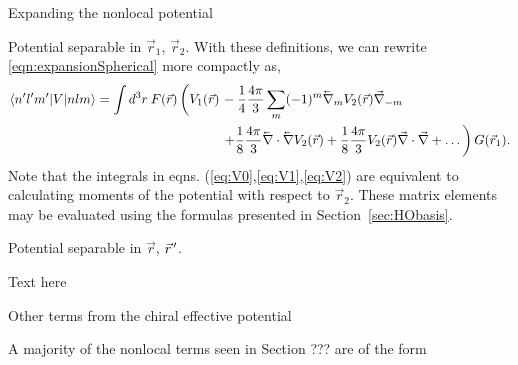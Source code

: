 \begin{section}{Expanding the nonlocal potential}
\begin{subsection}{Potential separable in $\vec{r}_1$, $\vec{r}_2$.\label{subsec:form1}}
With these definitions, we can rewrite \eqref{eqn:expansionSpherical} more compactly as,
\begin{equation}\label{eqn:expansion2}
\begin{split}
\braket{n' l' m'| V | n l m} =  \int d^3r\: F(\vec{r})\left( \vphantom{\frac{1}{2}}V_1(\vec{r})\right.&-\frac{1}{4}\frac{4\pi}{3}\sum_m(-1)^m \lvec{\nabla}_{m}  V_2(\vec{r}) \vec{\nabla}_{-m} \\
&\left.+\frac{1}{8}\frac{4\pi}{3}\lvec{\nabla}\cdot\lvec{\nabla} V_2(\vec{r})+\frac{1}{8}\frac{4\pi}{3}V_2(\vec{r})\vec{\nabla}\cdot\vec{\nabla}+\dots\right) G(\vec{r}_1).
\end{split}
\end{equation}
Note that the integrals in eqns. (\ref{eq:V0},\ref{eq:V1},\ref{eq:V2})  are equivalent to calculating moments of the potential with respect to $\vec{r}_2$. These matrix elements may be evaluated using the formulas presented in Section~\ref{sec:HObasis}.

\end{subsection}

\begin{subsection}{Potential separable in $\vec{r}$, $\vec{r}\mkern2mu'$.}

Text here

\end{subsection}

\begin{subsection}{Other terms from the chiral effective potential}

A majority of the nonlocal terms seen in Section ??? are of the form


\end{subsection}
\end{section}
